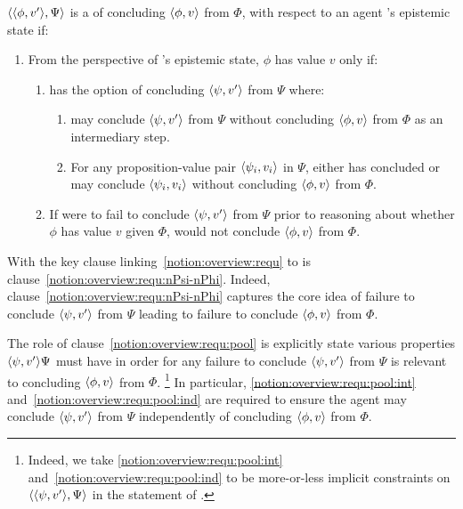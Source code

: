 \begin{note}
  \begin{notion}[\requ{3}]
    \label{notion:overview:requ}
    \(\langle \langle \phi, v' \rangle, \Psi \rangle\) is a \requ{} of concluding \(\langle \phi, v \rangle\) from \(\Phi\), with respect to an agent \vAgent{}'s epistemic state if:
    \begin{enumerate}
    \item
      \label{notion:overview:requ:main}
      From the perspective of \vAgent{}'s epistemic state, \(\phi\) has value \(v\) only if:
      \begin{enumerate}[label=\alph*., ref=\named{R:\alph*}]
      \item
        \label{notion:overview:requ:pool}
        \vAgent{} has the option of concluding \(\langle \psi, v' \rangle\) from \(\Psi\) where:
        \begin{enumerate}[label=\roman*., ref=\named{R:a.\roman*}, series=csIdeaCounter]
        \item
          \label{notion:overview:requ:pool:int}
          \vAgent{} may conclude \(\langle \psi, v' \rangle\) from \(\Psi\) without concluding \(\langle \phi, v \rangle\) from \(\Phi\) as an intermediary step.
        \item
          \label{notion:overview:requ:pool:ind}
          For any proposition-value pair \(\langle \psi_{i}, v_{i} \rangle\) in \(\Psi\), \vAgent{} either has concluded or may conclude \(\langle \psi_{i}, v_{i} \rangle\) without concluding \(\langle \phi, v \rangle\) from \(\Phi\).
        \end{enumerate}
      \item
        \label{notion:overview:requ:nPsi-nPhi}
        If \vAgent{} were to fail to conclude \(\langle \psi, v' \rangle\) from \(\Psi\) prior to reasoning about whether \(\phi\) has value \(v\) given \(\Phi\), \vAgent{} would not conclude \(\langle \phi, v \rangle\) from \(\Phi\).
      \end{enumerate}
    \end{enumerate}
    \vspace{-\baselineskip}
  \end{notion}

  With the key clause linking~\autoref{notion:overview:requ} to \qzS{} is clause~\ref{notion:overview:requ:nPsi-nPhi}.
  Indeed, clause~\ref{notion:overview:requ:nPsi-nPhi} captures the core idea of failure to conclude \(\langle \psi, v' \rangle\) from \(\Psi\) leading to failure to conclude \(\langle \phi, v \rangle\) from \(\Phi\).

  The role of clause~\ref{notion:overview:requ:pool} is explicitly state various properties \(\langle \psi, v' \rangle{\Psi}\) must have in order for any failure to conclude \(\langle \psi, v' \rangle\) from \(\Psi\) is relevant to concluding \(\langle \phi, v \rangle\) from \(\Phi\).%
  \footnote{
    Indeed, we take \ref{notion:overview:requ:pool:int} and~\ref{notion:overview:requ:pool:ind} to be more-or-less implicit constraints on \(\langle \langle \psi, v' \rangle, \Psi \rangle\) in the statement of \qzS{}.
  }
  In particular, \ref{notion:overview:requ:pool:int} and~\ref{notion:overview:requ:pool:ind} are required to ensure the agent may conclude \(\langle \psi, v' \rangle\) from \(\Psi\) independently of concluding \(\langle \phi, v \rangle\) from \(\Phi\).


\end{note}
